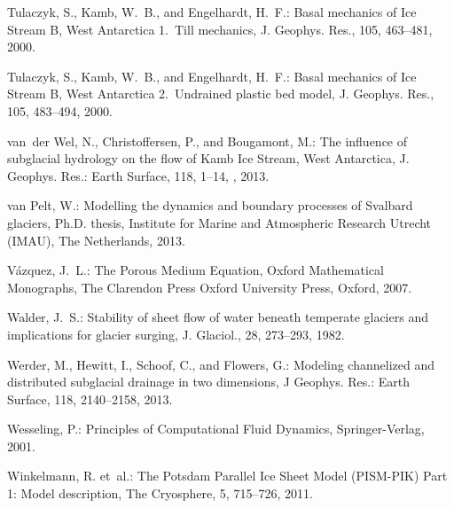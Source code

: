 \documentclass[gmd]{copernicus}   %
\begin{document}
\begin{thebibliography}{}
Tulaczyk, S., Kamb, W.~B., and Engelhardt, H.~F.: Basal mechanics of {I}ce
  {S}tream {B}, {W}est {A}ntarctica 1.~{T}ill mechanics, J. Geophys. Res., 105,
  463--481, 2000{}.

Tulaczyk, S., Kamb, W.~B., and Engelhardt, H.~F.: Basal mechanics of {I}ce
  {S}tream {B}, {W}est {A}ntarctica 2.~{U}ndrained plastic bed model, J.
  Geophys. Res., 105, 483--494, 2000{}.

van~der Wel, N., Christoffersen, P., and Bougamont, M.: The influence of
  subglacial hydrology on the flow of {K}amb {I}ce {S}tream, {W}est
  {A}ntarctica, J. Geophys. Res.: Earth Surface, 118, 1--14,
  , 2013.

van Pelt, W.: Modelling the dynamics and boundary processes of {S}valbard
  glaciers, Ph.D. thesis, Institute for Marine and Atmospheric Research Utrecht
  (IMAU), The Netherlands, 2013.

V{\'a}zquez, J.~L.: The {P}orous {M}edium {E}quation, Oxford Mathematical
  Monographs, The Clarendon Press Oxford University Press, Oxford, 2007.

Walder, J.~S.: Stability of sheet flow of water beneath temperate glaciers and
  implications for glacier surging, J. Glaciol., 28, 273--293, 1982.

Werder, M., Hewitt, I., Schoof, C., and Flowers, G.: Modeling channelized and
  distributed subglacial drainage in two dimensions, J Geophys. Res.: Earth
  Surface, 118, 2140--2158, 2013.

Wesseling, P.: Principles of {C}omputational {F}luid {D}ynamics,
  Springer-Verlag, 2001.

Winkelmann, R. et~al.: The {P}otsdam {P}arallel {I}ce {S}heet
  {M}odel ({PISM-PIK}) {P}art 1: {M}odel description, The Cryosphere, 5,
  715--726, 2011.
\end{thebibliography}


\appendix
\end{document}
